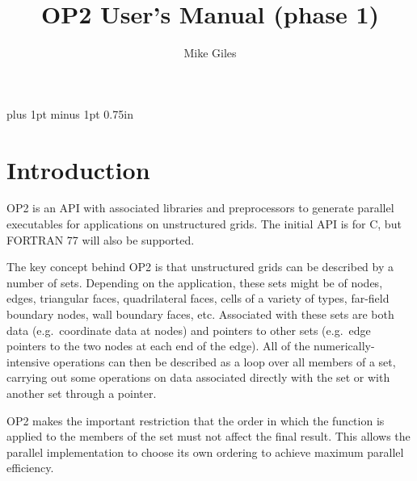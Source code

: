 %
%
   \headheight 0pt  \headsep 0pt  \raggedbottom
 \oddsidemargin 0.1in 
 \textheight 9.5in  \textwidth 6.00in 
 \parskip 5pt plus 1pt minus 1pt
 \def \baselinestretch {1.25}   %
 \setlength {\unitlength} {0.75in}
%
%
\newenvironment{routine}[2]
{\vspace{.25in}{\noindent\bf\hspace{0pt} #1}{\\ \noindent #2}
\begin{list}{}{
\renewcommand{\makelabel}[1]{{\tt ##1} \hfil} 
\itemsep 0pt plus 1pt minus 1pt
\leftmargin  1.2in
\rightmargin 0.0in
\labelwidth  1.1in
\itemindent  0.0in
\listparindent  0.0in
\labelsep    0.05in}
}{\end{list}}
%



\title{OP2 User's Manual (phase 1)}
\author{Mike Giles}
\maketitle


\newpage
\section{Introduction}

OP2 is an API with associated libraries and preprocessors to 
generate parallel executables for applications on unstructured grids.  
The initial API is for C, but FORTRAN 77 will also be supported.

The key concept behind OP2 is that unstructured grids can be described
by a number of sets.  Depending on the application, these sets might
be of nodes, edges, triangular faces, quadrilateral faces, cells of
a variety of types, far-field boundary nodes, wall boundary faces, etc.
Associated with these sets are both data (e.g.~coordinate data at 
nodes) and pointers to other sets (e.g.~edge pointers to the two 
nodes at each end of the edge).  All of the numerically-intensive
operations can then be described as a loop over all members of a set, 
carrying out some operations on data associated directly
with the set or with another set through a pointer.   

OP2 makes the important restriction that the order in which the
function is applied to the members of the set must not affect the
final result.  This allows the parallel implementation to choose
its own ordering to achieve maximum parallel efficiency.

